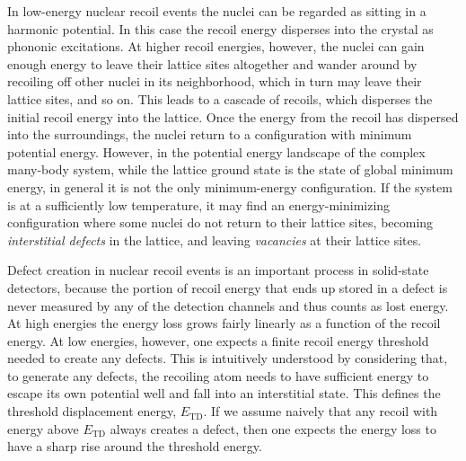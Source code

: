 In low-energy nuclear recoil events the nuclei can be regarded as sitting in a harmonic potential. In this case the recoil energy disperses into the crystal as phononic excitations. At higher recoil energies, however, the nuclei can gain enough energy to leave their lattice sites altogether and wander around by recoiling off other nuclei in its neighborhood, which in turn may leave their lattice sites, and so on. This leads to a cascade of recoils, which disperses the initial recoil energy into the lattice. Once the energy from the recoil has dispersed into the surroundings, the nuclei return to a configuration with minimum potential energy. However, in the potential energy landscape of the complex many-body system, while the lattice ground state is the state of global minimum energy, in general it is not the only minimum-energy configuration. If the system is at a sufficiently low temperature, it may find an energy-minimizing configuration where some nuclei do not return to their lattice sites, becoming \emph{interstitial defects} in the lattice, and leaving \emph{vacancies} at their lattice sites.

Defect creation in nuclear recoil events is an important process in solid-state detectors, because the portion of recoil energy that ends up stored in a defect is never measured by any of the detection channels and thus counts as lost energy. At high energies the energy loss grows fairly linearly as a function of the recoil energy. At low energies, however, one expects a finite recoil energy threshold needed to create any defects. This is intuitively understood by considering that, to generate any defects, the recoiling atom needs to have sufficient energy to escape its own potential well and fall into an interstitial state. This defines the threshold displacement energy, $E_\text{TD}$. If we assume naively that any recoil with energy above $E_\text{TD}$ always creates a defect, then one expects the energy loss to have a sharp rise around the threshold energy.

